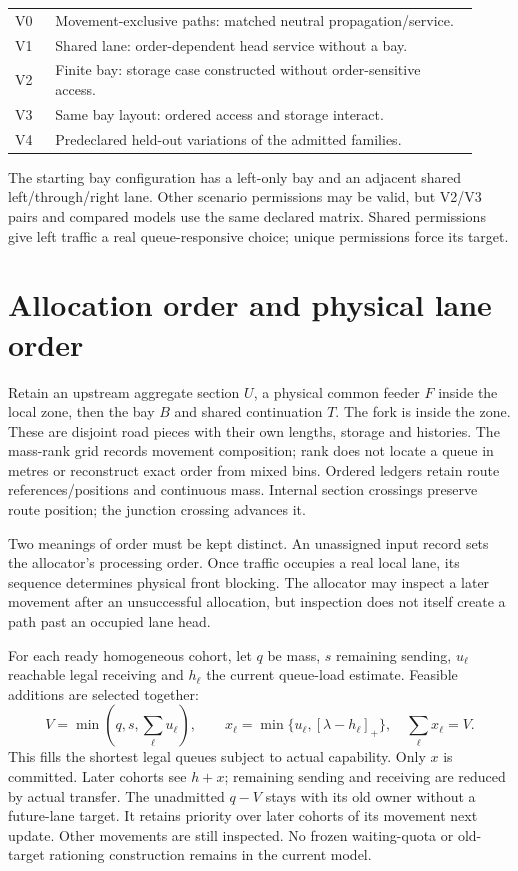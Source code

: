\documentclass[11pt,a4paper]{article}
\begin{document}
\begin{center}
\begin{tabular}{@{}p{0.08\linewidth}p{0.84\linewidth}@{}}
\toprule
V0 & Movement-exclusive paths: matched neutral propagation/service.\\
V1 & Shared lane: order-dependent head service without a bay.\\
V2 & Finite bay: storage case constructed without order-sensitive access.\\
V3 & Same bay layout: ordered access and storage interact.\\
V4 & Predeclared held-out variations of the admitted families.\\
\bottomrule
\end{tabular}
\end{center}

The starting bay configuration has a left-only bay and an adjacent shared
left/through/right lane. Other scenario permissions may be valid, but
V2/V3 pairs and compared models use the same declared matrix. Shared
permissions give left traffic a real queue-responsive choice; unique
permissions force its target.

\section{Allocation order and physical lane order}

Retain an upstream aggregate section $U$, a physical common feeder $F$
inside the local zone, then the bay $B$ and shared continuation $T$.
The fork is inside the zone. These are disjoint road pieces with their
own lengths, storage and histories. The mass-rank grid records movement
composition; rank does not locate a queue in metres or reconstruct exact
order from mixed bins. Ordered ledgers retain route references/positions
and continuous mass. Internal section crossings preserve route position;
the junction crossing advances it.

Two meanings of order must be kept distinct. An unassigned input record
sets the allocator's processing order. Once traffic occupies a real local
lane, its sequence determines physical front blocking. The allocator
may inspect a later movement after an unsuccessful allocation, but inspection
does not itself create a path past an occupied lane head.

For each ready homogeneous cohort, let $q$ be mass, $s$ remaining sending,
$u_\ell$ reachable legal receiving and $h_\ell$ the current queue-load
estimate. Feasible additions are selected together:
\begin{equation}
 V=\min(q,s,\sum_\ell u_\ell),\qquad
 x_\ell=\min\{u_\ell,[\lambda-h_\ell]_+\},\quad
 \sum_\ell x_\ell=V .
 \label{eq:compact-allocation}
\end{equation}
This fills the shortest legal queues subject to actual capability.
Only $x$ is committed. Later cohorts see $h+x$; remaining sending and
receiving are reduced by actual transfer. The unadmitted $q-V$ stays
with its old owner without a future-lane target. It retains priority
over later cohorts of its movement next update. Other movements are
still inspected. No frozen waiting-quota or old-target rationing
construction remains in the current model.
\end{document}
